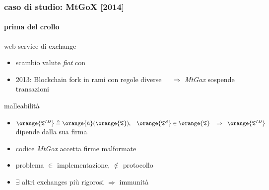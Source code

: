 \begin{frame}
\frametitle{caso di studio: MtGoX [2014]}
\framesubtitle{prima del crollo}
	
	web service di {\color{blue} exchange} 
	\begin{itemize}
	  \item scambio valute \textit{fiat} con \bitcoinA
	  \item 2013: Blockchain fork in rami con regole diverse 
	  \newline $\;\;\;\;\Rightarrow$ \textit{MtGox} sospende transazioni
	\end{itemize}
	
	{\color{blue} malleabilità}
	\begin{itemize}
		\item $\orange{\mathfrak{T}^{ID}}\triangleq \orange{h}(\orange{\mathfrak{T}}),
			\;\;\;\orange{\mathfrak{T}^S}\in\orange{\mathfrak{T}}\;\;\;\Rightarrow
			\;\;\orange{\mathfrak{T}^{ID}}$ dipende dalla sua firma   
	 	\item codice \textit{MtGox} accetta firme malformate
	 	\item problema $\in$ implementazione, $\mathbf{\notin}$ protocollo \bitcoinA
	 	\item $\exists$ altri exchanges più rigorosi $\Rightarrow$ immunità
	\end{itemize}

\end{frame}

